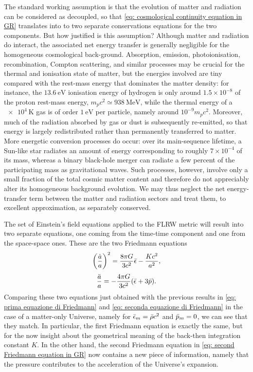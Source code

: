 The standard working assumption is that the evolution of matter and radiation can be considered as decoupled, so that \eqref{eq: cosmological continuity equation in GR} translates into to two separate conservations equations for the two components. But how justified is this assumption? Although matter and radiation do interact, the associated net energy transfer is generally negligible for the homogeneous cosmological back-ground. Absorption, emission, photoionisation, recombination, Compton scattering, and similar processes may be crucial for the thermal and ionisation state of matter, but the energies involved are tiny compared with the rest-mass energy that dominates the matter density: for instance, the $\SI{13.6}{\eV}$ ionisation energy of hydrogen is only around $1.5 \times 10^{-8}$ of the proton rest-mass energy, $m_p c^2 \simeq \SI{938}{\MeV}$, while the thermal energy of a $\SI{e4}{\kelvin}$ gas is of order $\SI{1}{\eV}$ per particle, namely around $10^{-9}m_p c^2$. Moreover, much of the radiation absorbed by gas or dust is subsequently re-emitted, so that energy is largely redistributed rather than permanently transferred to matter. More energetic conversion processes do occur: over its main-sequence lifetime, a Sun-like star radiates an amount of energy corresponding to roughly $7 \times 10^{-4}$ of its mass, whereas a binary black-hole merger can radiate a few percent of the participating mass as gravitational waves. Such processes, however, involve only a small fraction of the total cosmic matter content and therefore do not appreciably alter its homogeneous background evolution. We may thus neglect the net energy-transfer term between the matter and radiation sectors and treat them, to excellent approximation, as separately conserved.

The set of Einstein's field equations applied to the FLRW metric will result into two separate equations, one coming from the time-time component and one from the space-space ones. These are the two Friedmann equations 
\begin{equation}
\label{eq: first Friedmann equation in GR}
    \bigg(\frac{\dot{a}}{a}\bigg)^2 = \frac{8\pi G}{3c^2}\bar{\epsilon} - \frac{Kc^2}{a^2},
\end{equation}
\begin{equation}
\label{eq: second Friedmann equation in GR}
    \frac{\ddot{a}}{a} = -\frac{4\pi G}{3c^2}(\bar{\epsilon} + 3\bar{p}).
\end{equation}
Comparing these two equations just obtained with the previous results in \eqref{eq: prima equazione di Friedmann} and \eqref{eq: seconda equazione di Friedmann} in the case of a matter-only Universe, namely for $\bar{\epsilon}_m = \bar{\rho}c^2$ and $\bar{p}_m = 0$, we can see that they match. In particular, the first Friedmann equation is exactly the same, but for the now insight about the geometrical meaning of the back-then integration constant $K$. In the other hand, the second Friedmann equation in \eqref{eq: second Friedmann equation in GR} now contains a new piece of information, namely that the pressure contributes to the acceleration of the Universe's expansion.

